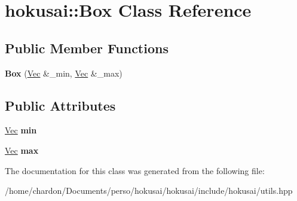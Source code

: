 \hypertarget{classhokusai_1_1Box}{\section{hokusai\+:\+:Box Class Reference}
\label{classhokusai_1_1Box}
}
\subsection*{Public Member Functions}
\begin{DoxyCompactItemize}
\item 
\hypertarget{classhokusai_1_1Box_a1a3242cde9ae8eccd9e99a29954270af}{{\bfseries Box} (\hyperlink{classhokusai_1_1Vec3}{Vec} \&\+\_\+min, \hyperlink{classhokusai_1_1Vec3}{Vec} \&\+\_\+max)}\label{classhokusai_1_1Box_a1a3242cde9ae8eccd9e99a29954270af}

\end{DoxyCompactItemize}
\subsection*{Public Attributes}
\begin{DoxyCompactItemize}
\item 
\hypertarget{classhokusai_1_1Box_a2bc4514fba93484935d219646e58a332}{\hyperlink{classhokusai_1_1Vec3}{Vec} {\bfseries min}}\label{classhokusai_1_1Box_a2bc4514fba93484935d219646e58a332}

\item 
\hypertarget{classhokusai_1_1Box_aafc962413042e3bfc29a15b67a132afd}{\hyperlink{classhokusai_1_1Vec3}{Vec} {\bfseries max}}\label{classhokusai_1_1Box_aafc962413042e3bfc29a15b67a132afd}

\end{DoxyCompactItemize}


The documentation for this class was generated from the following file\+:\begin{DoxyCompactItemize}
\item 
/home/chardon/\+Documents/perso/hokusai/hokusai/include/hokusai/utils.\+hpp\end{DoxyCompactItemize}
